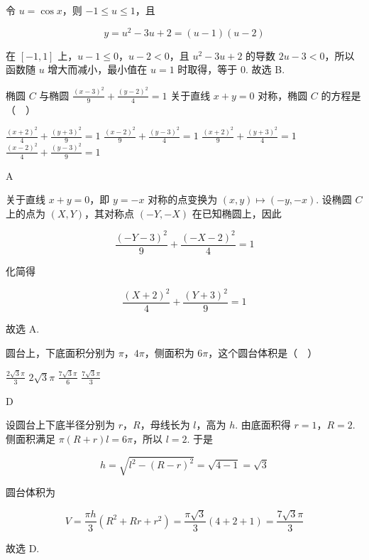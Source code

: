 \begin{solution}
令 \(u=\cos x\)，则 \(-1\leqslant u\leqslant1\)，且

\[
y=u^{2}-3u+2=(u-1)(u-2)
\]

在 \([-1,1]\) 上，\(u-1\leqslant0\)，\(u-2<0\)，且 \(u^{2}-3u+2\) 的导数 \(2u-3<0\)，所以函数随 \(u\) 增大而减小，最小值在 \(u=1\) 时取得，等于 \(0\). 故选 B.
\end{solution}

\begin{problem}
椭圆 \(C\) 与椭圆 \(\frac{(x - 3)^{2}}{9} + \frac{(y - 2)^{2}}{4} = 1\) 关于直线 \(x + y = 0\) 对称，椭圆 \(C\) 的方程是（\(\quad\)）

\choices
    {\(\frac{(x + 2)^2}{4} + \frac{(y + 3)^2}{9} = 1\)}
    {\(\frac{(x - 2)^2}{9} + \frac{(y - 3)^2}{4} = 1\)}
    {\(\frac{(x + 2)^2}{9} + \frac{(y + 3)^2}{4} = 1\)}
    {\(\frac{(x - 2)^2}{4} + \frac{(y - 3)^2}{9} = 1\)}
\end{problem}

\begin{answer}
A
\end{answer}

\begin{solution}
关于直线 \(x+y=0\)，即 \(y=-x\) 对称的点变换为 \((x,y)\mapsto(-y,-x)\). 设椭圆 \(C\) 上的点为 \((X,Y)\)，其对称点 \((-Y,-X)\) 在已知椭圆上，因此

\[
\frac{(-Y-3)^{2}}{9}+\frac{(-X-2)^{2}}{4}=1
\]

化简得

\[
\frac{(X+2)^{2}}{4}+\frac{(Y+3)^{2}}{9}=1
\]

故选 A.
\end{solution}

\begin{problem}
圆台上，下底面积分别为 \(\pi\)，\(4\pi\)，侧面积为 \(6\pi\)，这个圆台体积是（\(\quad\)）

\choices
    {\(\frac{2\sqrt{3}\pi}{3}\)}
    {\(2\sqrt{3}\pi\)}
    {\(\frac{7\sqrt{3}\pi}{6}\)}
    {\(\frac{7\sqrt{3}\pi}{3}\)}
\end{problem}

\begin{answer}
D
\end{answer}

\begin{solution}
设圆台上下底半径分别为 \(r\)，\(R\)，母线长为 \(l\)，高为 \(h\). 由底面积得 \(r=1\)，\(R=2\). 侧面积满足 \(\pi(R+r)l=6\pi\)，所以 \(l=2\). 于是

\[
h=\sqrt{l^{2}-(R-r)^{2}}=\sqrt{4-1}=\sqrt{3}
\]

圆台体积为

\[
V=\frac{\pi h}{3}(R^{2}+Rr+r^{2})=\frac{\pi\sqrt{3}}{3}(4+2+1)=\frac{7\sqrt{3}\pi}{3}
\]

故选 D.
\end{solution}

